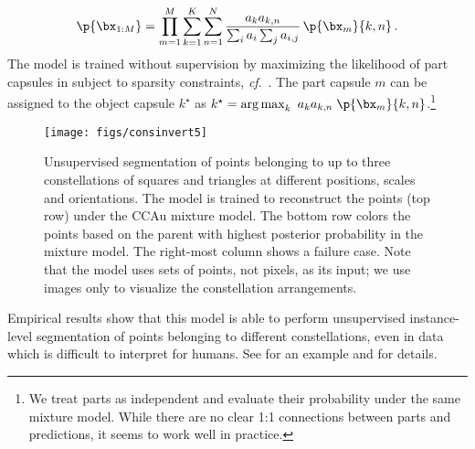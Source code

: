 \vspace*{-1.2em}
\begin{equation}
    \p{\bx_{1:M}} = \prod_{m=1}^M \sum_{k=1}^K \sum_{n=1}^{N}  
    \frac{a_k a_{k,n}}{\sum_i a_i \sum_j a_{i,j}}
    \,\p{\bx_m}{k,n}\,. \label{eq:constellation_likelihood}
\end{equation}
The model is trained without supervision by maximizing the likelihood of part capsules in  subject to sparsity constraints, \textit{cf}.\ .
The part capsule $m$ can be assigned to the object capsule $k^\star$ as $k^\star = \operatorname{arg\,max}_{k}~a_k a_{k,n}\;\p{\bx_m}{k,n}$.\footnote{We treat parts as independent and evaluate their probability under the same mixture model. While there are no clear 1:1 connections between parts and predictions, it seems to work well in practice.}
\begin{figure} 
    \centering
    \begin{minipage}[c]{0.35\linewidth}
        \centering
        \texttt{[image: figs/consinvert5]}
    \end{minipage}
    \hfill
    \begin{minipage}[c]{0.63\linewidth}
        \centering
        \caption{
            Unsupervised segmentation of points belonging to up to three constellations of squares and triangles at different positions, scales and orientations. 
            The model is trained to reconstruct the points (top row) under the \gls{CCAu} mixture model. The bottom row colors the points based on the parent with highest posterior probability in the mixture model. 
            The right-most column shows a failure case.
            Note that the model uses sets of points, not pixels, as its input; we use images  only to visualize the constellation arrangements.
        }
        \label{fig:constellations}
    \end{minipage}
    \vspace*{-.75em}
\end{figure}
Empirical results show that this model is able to perform unsupervised instance-level segmentation of points belonging to different constellations, even in data which is difficult to interpret for humans. See  for an example and  for details.

